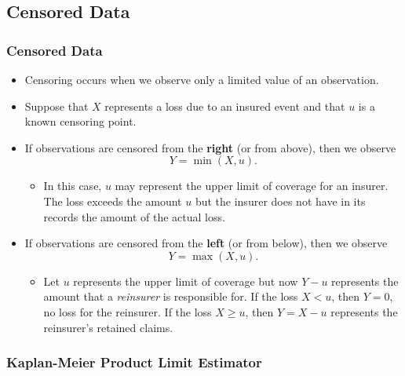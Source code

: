 \documentclass[]{book}
\providecommand{\tightlist}{%
  \setlength{\itemsep}{0pt}\setlength{\parskip}{0pt}}
\begin{document}
\subsection{Censored Data}\label{censored-data}

\subsubsection{Censored Data}\label{censored-data-1}

\begin{itemize}
\item
  Censoring occurs when we observe only a limited value of an
  observation.
\item
  Suppose that \(X\) represents a loss due to an insured event and that
  \(u\) is a known censoring point.
\item
  If observations are censored from the \textbf{right} (or from above),
  then we observe \[Y = \min(X,u).\]

  \begin{itemize}
  \tightlist
  \item
    In this case, \(u\) may represent the upper limit of coverage for an
    insurer. The loss exceeds the amount \(u\) but the insurer does not
    have in its records the amount of the actual loss.
  \end{itemize}
\item
  If observations are censored from the \textbf{left} (or from below),
  then we observe \[Y = \max(X,u).\]

  \begin{itemize}
  \tightlist
  \item
    Let \(u\) represents the upper limit of coverage but now \(Y - u\)
    represents the amount that a \emph{reinsurer} is responsible for. If
    the loss \(X < u\), then \(Y=0\), no loss for the reinsurer. If the
    loss \(X \ge u\), then \(Y= X-u\) represents the reinsurer's
    retained claims.
  \end{itemize}
\end{itemize}

\subsubsection{Kaplan-Meier Product Limit
Estimator}\label{kaplan-meier-product-limit-estimator}
\end{document}
